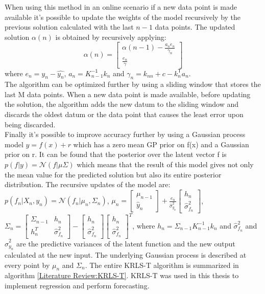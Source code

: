 When using this method in an online scenario if a new data point is made available it's possible to update the weights of the model recursively by the previous solution calculated with the last \(n-1\) data points. The updated solution \(\alpha(n)\) is obtained by recursively applying:
\[\alpha(n) = \begin{bmatrix} \alpha(n-1) - \frac{a_n e_n}{\gamma_n} \\ \frac{e_n}{\gamma} \end{bmatrix}\]
where \(e_n = y_n-\hat{y_n}\), \(a_n = K_{n-1}^\mathsf{-1}k_n\) and \(\gamma_n = k_{nn} + c - k_{n}^\mathsf{T}a_n\).\\

The algorithm can be optimized further by using a sliding window that stores the last M data points. When a new data point is made available, before updating the solution, the algorithm adds the new datum to the sliding window and discards the oldest datum or the data point that causes the least error upon being discarded.\\

Finally it's possible to improve accuracy further by using a Gaussian process model \(y = f(x) + r\) which has a zero mean GP prior on f(x) and a Gaussian prior on r. It can be found that the posterior over the latent vector f is \(p(f | y) = \mathcal{N} (f|\mu \Sigma)\) which means that the result of this model gives not only the mean value for the predicted solution but also its entire posterior distribution. The recursive updates of the model are:
\(p(f_{n}|X_{n}, y_{n}) = \mathcal{N} (f_{n}|\mu_{n}, \Sigma_{n})\), \(\mu_{n}= \begin{bmatrix} \mu_{n-1}\\ \hat{y}_{n} \end{bmatrix} + \frac{e_{n}}{\hat{\sigma}^{2}_{y_{n}}}\begin{bmatrix} h_{n}\\ \hat{\sigma}^{2}_{f_{n}} \end{bmatrix}\), 
\( \Sigma_{n} = \begin{bmatrix} \Sigma_{n-1} & h_{n} \\ h_{n}^{T} & \hat{\sigma}^{2}_{f_{n}} \end{bmatrix} - \begin{bmatrix} h_{n}\\ \hat{\sigma}^{2}_{f_{n}} \end{bmatrix} \begin{bmatrix} h_{n}\\ \hat{\sigma}^{2}_{f_{n}} \end{bmatrix}^{T} \), where \(h_n = \Sigma_{n-1}K_{n-1}^{-1} k_{n}\) and \(\hat{\sigma}^{2}_{f_{n}}\) and \(\hat{\sigma}^{2}_{y_{n}}\) are the predictive variances of the latent function and
the new output calculated at the new input. The underlying Gaussian process is described at every point by \( \mu_{n} \) and \( \Sigma_{n} \). The entire KRLS-T algorithm is summarized in algorithm \ref{Literature Review:KRLS-T}. KRLS-T was used in this thesis to implement regression and perform forecasting.

